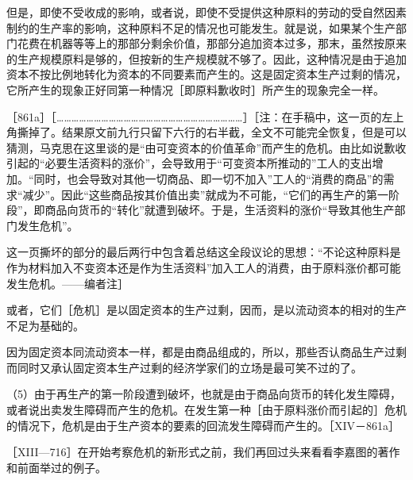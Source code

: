 但是，即使不受收成的影响，或者说，即使不受提供这种原料的劳动的受自然因素制约的生产率的影响，这种原料不足的情况也可能发生。就是说，如果某个生产部门花费在机器等等上的那部分剩余价值，那部分追加资本过多，那末，虽然按原来的生产规模原料是够的，但按新的生产规模就不够了。因此，这种情况是由于追加资本不按比例地转化为资本的不同要素而产生的。这是固定资本生产过剩的情况，它所产生的现象正好同第一种情况［即原料歉收时］所产生的现象完全一样。

［861a］［…………………………………………………………………］［注：在手稿中，这一页的左上角撕掉了。结果原文前九行只留下六行的右半截，全文不可能完全恢复，但是可以猜测，马克思在这里谈的是“由可变资本的价值革命”而产生的危机。由比如说歉收引起的“必要生活资料的涨价”，会导致用于“可变资本所推动的”工人的支出增加。“同时，也会导致对其他一切商品、即一切不加入”工人的“消费的商品”的需求“减少”。因此“这些商品按其价值出卖”就成为不可能，“它们的再生产的第一阶段”，即商品向货币的“转化”就遭到破坏。于是，生活资料的涨价“导致其他生产部门发生危机”。

这一页撕坏的部分的最后两行中包含着总结这全段议论的思想：“不论这种原料是作为材料加入不变资本还是作为生活资料”加入工人的消费，由于原料涨价都可能发生危机。——编者注］

或者，它们［危机］是以固定资本的生产过剩，因而，是以流动资本的相对的生产不足为基础的。

因为固定资本同流动资本一样，都是由商品组成的，所以，那些否认商品生产过剩而同时又承认固定资本生产过剩的经济学家们的立场是最可笑不过的了。

（5）由于再生产的第一阶段遭到破坏，也就是由于商品向货币的转化发生障碍，或者说出卖发生障碍而产生的危机。在发生第一种［由于原料涨价而引起的］危机的情况下，危机是由于生产资本的要素的回流发生障碍而产生的。［XIV－861a］


［XIII—716］在开始考察危机的新形式之前，我们再回过头来看看李嘉图的著作和前面举过的例子。


